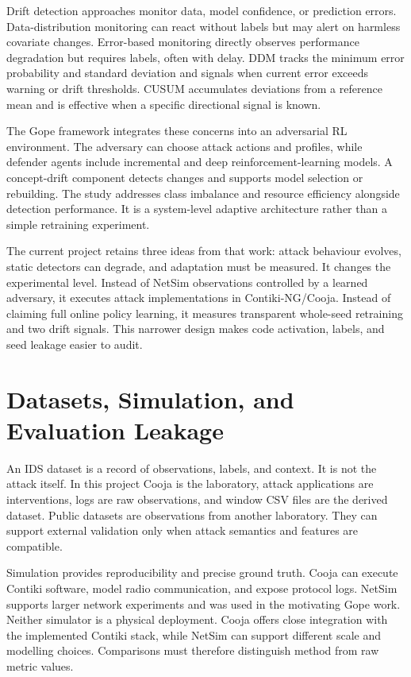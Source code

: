 Drift detection approaches monitor data, model confidence, or prediction errors. Data-distribution monitoring can react without labels but may alert on harmless covariate changes. Error-based monitoring directly observes performance degradation but requires labels, often with delay. DDM tracks the minimum error probability and standard deviation and signals when current error exceeds warning or drift thresholds. CUSUM accumulates deviations from a reference mean and is effective when a specific directional signal is known.

The Gope framework integrates these concerns into an adversarial RL environment. The adversary can choose attack actions and profiles, while defender agents include incremental and deep reinforcement-learning models. A concept-drift component detects changes and supports model selection or rebuilding. The study addresses class imbalance and resource efficiency alongside detection performance. It is a system-level adaptive architecture rather than a simple retraining experiment.

The current project retains three ideas from that work: attack behaviour evolves, static detectors can degrade, and adaptation must be measured. It changes the experimental level. Instead of NetSim observations controlled by a learned adversary, it executes attack implementations in Contiki-NG/Cooja. Instead of claiming full online policy learning, it measures transparent whole-seed retraining and two drift signals. This narrower design makes code activation, labels, and seed leakage easier to audit.

\section{Datasets, Simulation, and Evaluation Leakage}

An IDS dataset is a record of observations, labels, and context. It is not the attack itself. In this project Cooja is the laboratory, attack applications are interventions, logs are raw observations, and window CSV files are the derived dataset. Public datasets are observations from another laboratory. They can support external validation only when attack semantics and features are compatible.

Simulation provides reproducibility and precise ground truth. Cooja can execute Contiki software, model radio communication, and expose protocol logs. NetSim supports larger network experiments and was used in the motivating Gope work. Neither simulator is a physical deployment. Cooja offers close integration with the implemented Contiki stack, while NetSim can support different scale and modelling choices. Comparisons must therefore distinguish method from raw metric values.

